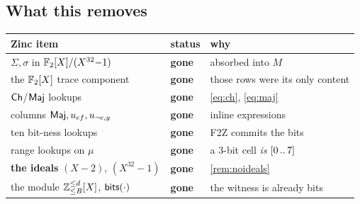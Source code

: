 \subsection{What this removes}

\begin{center}\small
\begin{tabular}{@{}p{}lp{}@{}}
\toprule
Zinc\raisebox{0.1ex}{+} item & status & why\\
\midrule
$\Sigma,\sigma$ in $\mathbb{F}_2[X]/(X^{32}{-}1)$ & \textbf{gone} & absorbed into $M$\\
the $\mathbb{F}_2[X]$ trace component & \textbf{gone} & those rows were its only content\\
$\mathsf{Ch}$/$\mathsf{Maj}$ lookups & \textbf{gone} & \eqref{eq:ch}, \eqref{eq:maj}\\
columns $\mathsf{Maj},u_{ef},u_{\neg e,g}$ & \textbf{gone} & inline expressions\\
ten bit-ness lookups & \textbf{gone} & F2Z commits the bits\\
range lookups on $\mu$ & \textbf{gone} & a 3-bit cell \emph{is} $[0 \,..\, 7]$\\
\textbf{the ideals} $(X{-}2)$, $(X^{32}{-}1)$ & \textbf{gone} & \cref{rem:noideals}\\
the module $\mathbb{Z}^{\leq d}_{\leq B}[X]$, $\mathsf{bits}(\cdot)$ & \textbf{gone} & the witness is already bits\\
\bottomrule
\end{tabular}
\end{center}

